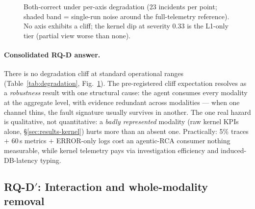 \begin{figure}[t]
\centering
{}
\caption{Both-correct under per-axis degradation (23 incidents per point; shaded band
= single-run noise around the full-telemetry reference). No axis exhibits a cliff;
the kernel dip at severity 0.33 is the L1-only tier (partial view worse than none).}
\label{fig:degradation}
\end{figure}

\paragraph{Consolidated RQ-D answer.} There is no degradation cliff at standard
operational ranges (Table~\ref{tab:degradation}, Fig.~\ref{fig:degradation}). The pre-registered cliff expectation
resolves as a \emph{robustness} result with one structural cause: the agent consumes
every modality at the aggregate level, with evidence redundant across modalities ---
when one channel thins, the fault signature usually survives in another. The one real
hazard is qualitative, not quantitative: a \emph{badly represented} modality (raw
kernel KPIs alone, \S\ref{sec:results-kernel}) hurts more than an absent one.
Practically: 5\% traces $+$ 60\,s metrics $+$ ERROR-only logs cost an agentic-RCA
consumer nothing measurable, while kernel telemetry pays via investigation efficiency
and induced-DB-latency typing.

\subsection{RQ-D$'$: Interaction and whole-modality removal}
\label{sec:results-interact}

